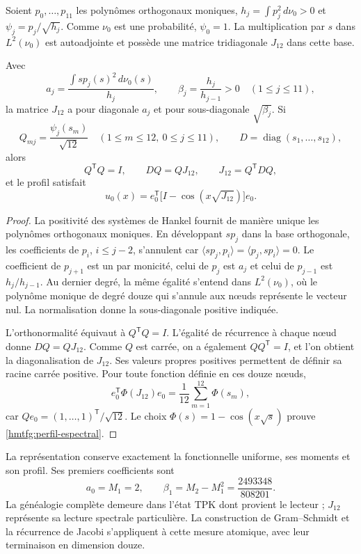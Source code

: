 Soient \(p_0,\ldots,p_{11}\) les polynômes orthogonaux moniques,
\(h_j=\int p_j^2\,d\nu_0>0\) et
\(\psi_j=p_j/\sqrt{h_j}\). Comme \(\nu_0\) est une probabilité,
\(\psi_0=1\). La multiplication par \(s\) dans \(L^2(\nu_0)\) est autoadjointe et possède une matrice tridiagonale \(J_{12}\) dans cette base.

\begin{proposition}
\label{hmtfg:jacobi-entrelazamiento}
Avec
\[
 a_j=\frac{\int s p_j(s)^2\,d\nu_0(s)}{h_j},\qquad
 \beta_j=\frac{h_j}{h_{j-1}}>0\quad(1\le j\le11),
\]
la matrice \(J_{12}\) a pour diagonale \(a_j\) et pour sous-diagonale
\(\sqrt{\beta_j}\). Si
\[
 Q_{mj}=\frac{\psi_j(s_m)}{\sqrt{12}}
 \quad(1\le m\le12,\ 0\le j\le11),\qquad
 D=\operatorname{diag}(s_1,\ldots,s_{12}),
\]
alors
\[
 Q^{\mathsf T}Q=I,\qquad DQ=QJ_{12},\qquad
 J_{12}=Q^{\mathsf T}DQ,
\]
et le profil satisfait
\begin{equation}
 u_0(x)=e_0^{\mathsf T}
          \bigl[I-\cos(x\sqrt{J_{12}})\bigr]e_0.
 \label{hmtfg:perfil-espectral}
\end{equation}
\end{proposition}
\begin{proof}
La positivité des systèmes de Hankel fournit de manière unique les polynômes orthogonaux moniques. En développant \(s p_j\) dans la base orthogonale, les coefficients de \(p_i\), \(i\le j-2\), s’annulent car
\(\langle sp_j,p_i\rangle=\langle p_j,sp_i\rangle=0\).
Le coefficient de \(p_{j+1}\) est un par monicité, celui de \(p_j\) est \(a_j\) et celui de \(p_{j-1}\) est \(h_j/h_{j-1}\). Au dernier degré, la même égalité s’entend dans \(L^2(\nu_0)\), où le polynôme monique de degré douze qui s’annule aux nœuds représente le vecteur nul. La normalisation donne la sous-diagonale positive indiquée.

L’orthonormalité équivaut à \(Q^{\mathsf T}Q=I\). L’égalité de récurrence à chaque nœud donne \(DQ=QJ_{12}\). Comme \(Q\) est carrée, on a également \(QQ^{\mathsf T}=I\), et l’on obtient la diagonalisation de \(J_{12}\). Ses valeurs propres positives permettent de définir sa racine carrée positive. Pour toute fonction définie en ces douze nœuds,
\[
 e_0^{\mathsf T}\Phi(J_{12})e_0
   =\frac1{12}\sum_{m=1}^{12}\Phi(s_m),
\]
car \(Qe_0=(1,\ldots,1)^{\mathsf T}/\sqrt{12}\).
Le choix \(\Phi(s)=1-\cos(x\sqrt{s})\) prouve
\eqref{hmtfg:perfil-espectral}.
\end{proof}

La représentation conserve exactement la fonctionnelle uniforme, ses moments et son profil. Ses premiers coefficients sont
\[
 a_0=M_1=2,\qquad
 \beta_1=M_2-M_1^2=\frac{2493348}{808201}.
\]
La généalogie complète demeure dans l’état TPK dont provient le lecteur ; \(J_{12}\) représente sa lecture spectrale particulière. La construction de Gram--Schmidt et la récurrence de Jacobi s’appliquent à cette mesure atomique, avec leur terminaison en dimension douze.

